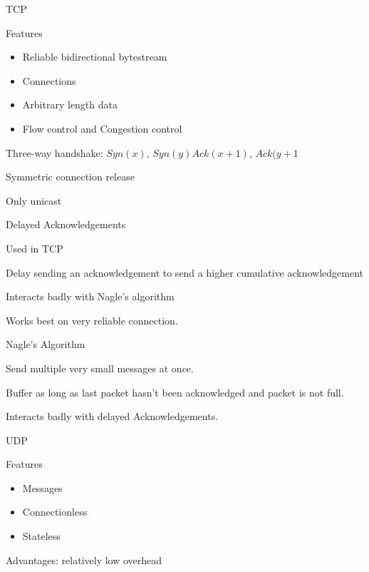 \documentclass[main.tex]{subfiles}
\begin{document}
\small


\begin{card}{TCP}
\item Features
    \begin{itemize}
        \item Reliable bidirectional bytestream
        \item Connections
        \item Arbitrary length data
        \item Flow control and Congestion control
    \end{itemize}
\item Three-way handshake: $Syn(x)$, $Syn(y)Ack(x+1)$, $Ack(y+1$
\item Symmetric connection release
\item Only unicast
\end{card}

\begin{card}{Delayed Acknowledgements}
\item Used in TCP
\item Delay sending an acknowledgement to send a higher cumulative acknowledgement
\item Interacts badly with Nagle's algorithm
\item Works best on very reliable connection.
\end{card}

\begin{card}{Nagle's Algorithm}
\item Send multiple very small messages at once.
\item Buffer as long as last packet hasn't been acknowledged and packet is not full.
\item Interacts badly with delayed Acknowledgements.
\end{card}

\begin{card}{UDP}
\item Features
    \begin{itemize}
        \item Messages
        \item Connectionless
        \item Stateless
    \end{itemize}
\item Advantages: relatively low overhead
\end{card}
\end{document}
